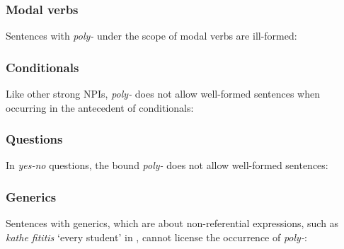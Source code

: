 \documentclass[output=paper]{langscibook}
\begin{document}
\subsubsection{Modal verbs}

\noindent Sentences with \textit{poly-} under the scope of modal verbs are ill-formed:

\begin{exe}
        \label{gia:ex12}
\end{exe}

\subsubsection{Conditionals}

\noindent Like other strong NPIs, \textit{poly-} does not allow well-formed sentences when occurring in the antecedent of conditionals:

\begin{exe}
        \label{gia:ex13}
\end{exe}

\subsubsection{Questions}

\noindent In \textit{yes-no} questions, the bound \textit{poly-} does not allow well-formed sentences:

\begin{exe}
        \label{gia:ex14}
\end{exe}

\subsubsection{Generics}

\noindent Sentences with generics, which are about non-referential expressions, such as \textit{kathe fititis} `every student' in , cannot license the occurrence of \textit{poly-}:
\end{document}
